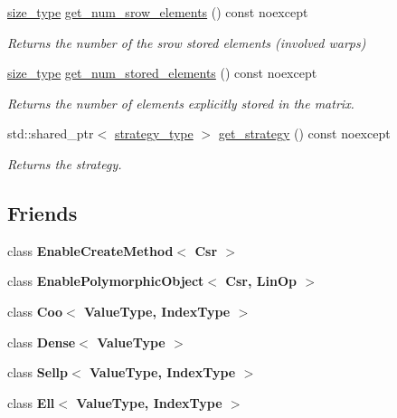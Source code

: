 \begin{DoxyCompactItemize}
\hyperlink{namespacegko_a6e5c95df0ae4e47aab2f604a22d98ee7}{size\+\_\+type} \hyperlink{classgko_1_1matrix_1_1Csr_a5b8c25c2fb1bbea62a3afdec8f8340c5}{get\+\_\+num\+\_\+srow\+\_\+elements} () const noexcept
\begin{DoxyCompactList}\small\item\em Returns the number of the srow stored elements (involved warps) \end{DoxyCompactList}\item 
\hyperlink{namespacegko_a6e5c95df0ae4e47aab2f604a22d98ee7}{size\+\_\+type} \hyperlink{classgko_1_1matrix_1_1Csr_ab70c085fc3df11a4ed9fe74b40844c5c}{get\+\_\+num\+\_\+stored\+\_\+elements} () const noexcept
\begin{DoxyCompactList}\small\item\em Returns the number of elements explicitly stored in the matrix. \end{DoxyCompactList}\item 
std\+::shared\+\_\+ptr$<$ \hyperlink{classgko_1_1matrix_1_1Csr_1_1strategy__type}{strategy\+\_\+type} $>$ \hyperlink{classgko_1_1matrix_1_1Csr_ada0db14e65dfe027f483dc449f704a7e}{get\+\_\+strategy} () const noexcept
\begin{DoxyCompactList}\small\item\em Returns the strategy. \end{DoxyCompactList}\end{DoxyCompactItemize}
\subsection*{Friends}
\begin{DoxyCompactItemize}
\item 
\mbox{\label{classgko_1_1matrix_1_1Csr_ad8cd96663ce0ef68ea6d54f3d163df35}} 
class {\bfseries Enable\+Create\+Method$<$ Csr $>$}
\item 
\mbox{\label{classgko_1_1matrix_1_1Csr_a6fa2ee2c326608dac42afed82be6713c}} 
class {\bfseries Enable\+Polymorphic\+Object$<$ Csr, Lin\+Op $>$}
\item 
\mbox{\label{classgko_1_1matrix_1_1Csr_ad2572ffab980b4728254b155909b3119}} 
class {\bfseries Coo$<$ Value\+Type, Index\+Type $>$}
\item 
\mbox{\label{classgko_1_1matrix_1_1Csr_a22a84c8f67f946aa60a2fa8bf5835a32}} 
class {\bfseries Dense$<$ Value\+Type $>$}
\item 
\mbox{\label{classgko_1_1matrix_1_1Csr_a400cb6dae6e6294b9f7d0249d63d538c}} 
class {\bfseries Sellp$<$ Value\+Type, Index\+Type $>$}
\item 
\mbox{\label{classgko_1_1matrix_1_1Csr_aed957ed9db4269e50fc8aa3d0263e618}} 
class {\bfseries Ell$<$ Value\+Type, Index\+Type $>$}
\end{DoxyCompactItemize}

